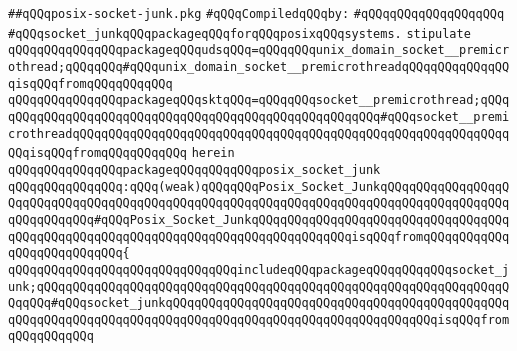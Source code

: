 \label{src/lib/internet/posix-socket-junk.pkg}
\verb|##qQQqposix-socket-junk.pkg|\newline
\newline
\verb|#qQQqCompiledqQQqby:|\newline
\verb|#qQQqqQQqqQQqqQQqqQQq|\newline
\newline
\verb|#qQQqsocket_junkqQQqpackageqQQqforqQQqposixqQQqsystems.|\newline
\newline
\verb|stipulate|\newline
\verb|qQQqqQQqqQQqqQQqpackageqQQqudsqQQq=qQQqqQQqunix_domain_socket__premicrothread;qQQqqQQq#qQQqunix_domain_socket__premicrothreadqQQqqQQqqQQqqQQqisqQQqfromqQQqqQQqqQQq|\newline
\verb|qQQqqQQqqQQqqQQqpackageqQQqsktqQQq=qQQqqQQqsocket__premicrothread;qQQqqQQqqQQqqQQqqQQqqQQqqQQqqQQqqQQqqQQqqQQqqQQqqQQqqQQq#qQQqsocket__premicrothreadqQQqqQQqqQQqqQQqqQQqqQQqqQQqqQQqqQQqqQQqqQQqqQQqqQQqqQQqqQQqqQQqisqQQqfromqQQqqQQqqQQq|\newline
\verb|herein|\newline
\newline
\verb|qQQqqQQqqQQqqQQqpackageqQQqqQQqqQQqposix_socket_junk|\newline
\verb|qQQqqQQqqQQqqQQq:qQQq(weak)qQQqqQQqPosix_Socket_JunkqQQqqQQqqQQqqQQqqQQqqQQqqQQqqQQqqQQqqQQqqQQqqQQqqQQqqQQqqQQqqQQqqQQqqQQqqQQqqQQqqQQqqQQqqQQqqQQqqQQq#qQQqPosix_Socket_JunkqQQqqQQqqQQqqQQqqQQqqQQqqQQqqQQqqQQqqQQqqQQqqQQqqQQqqQQqqQQqqQQqqQQqqQQqqQQqqQQqqQQqisqQQqfromqQQqqQQqqQQq|\newline
\verb|qQQqqQQqqQQqqQQq{|\newline
\verb|qQQqqQQqqQQqqQQqqQQqqQQqqQQqqQQqincludeqQQqpackageqQQqqQQqqQQqsocket_junk;qQQqqQQqqQQqqQQqqQQqqQQqqQQqqQQqqQQqqQQqqQQqqQQqqQQqqQQqqQQqqQQqqQQqqQQq#qQQqsocket_junkqQQqqQQqqQQqqQQqqQQqqQQqqQQqqQQqqQQqqQQqqQQqqQQqqQQqqQQqqQQqqQQqqQQqqQQqqQQqqQQqqQQqqQQqqQQqqQQqqQQqqQQqqQQqisqQQqfromqQQqqQQqqQQq|\newline
\newline
